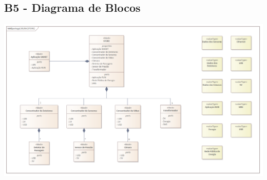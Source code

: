 \documentclass{article}
\begin{document}
\begin{landscape}
	\section*{B5 - Diagrama de Blocos}
	\vspace*{\fill}
	\begin{center}
		\includegraphics[width=1.5\textheight,height=\textwidth,keepaspectratio]{B5}
	\end{center}
	\vspace*{\fill}
\end{landscape}
\end{document}
